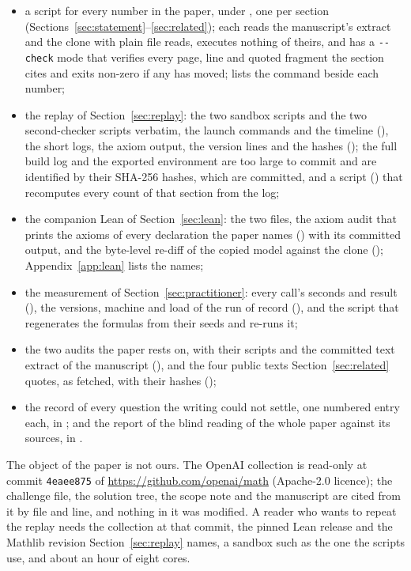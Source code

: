 \begin{itemize}
\item a script for every number in the paper, under
  , one per section
  (Sections~\ref{sec:statement}--\ref{sec:related}); each reads the
  manuscript's extract and the clone with plain file reads, executes
  nothing of theirs, and has a \texttt{-{}-check} mode that verifies every
  page, line and quoted fragment the section cites and exits non-zero
  if any has moved;  lists the command beside
  each number;
\item the replay of Section~\ref{sec:replay}: the two sandbox scripts
  and the two second-checker scripts verbatim, the launch commands and
  the timeline (), the short logs,
  the axiom output, the version lines and the hashes
  (); the full build log and the exported
  environment are too large to commit and are identified by their
  SHA-256 hashes, which are committed, and a script
  () that recomputes every count of
  that section from the log;
\item the companion Lean of Section~\ref{sec:lean}: the two files, the
  axiom audit that prints the axioms of every declaration the paper
  names () with its committed
  output, and the byte-level re-diff of the copied model against the
  clone (); Appendix~\ref{app:lean}
  lists the names;
\item the measurement of Section~\ref{sec:practitioner}: every call's
  seconds and result (),
  the versions, machine and load of the run of record
  (), and the
  script that regenerates the formulas from their seeds and re-runs it;
\item the two audits the paper rests on, with their scripts and the
  committed text extract of the manuscript
  (), and the four public texts
  Section~\ref{sec:related} quotes, as fetched, with their hashes
  ();
\item the record of every question the writing could not settle, one
  numbered entry each, in ; and the
  report of the blind reading of the whole paper against its sources,
  in .
\end{itemize}
The object of the paper is not ours. The OpenAI collection is read-only
at commit \texttt{4eaee875} of \url{https://github.com/openai/math}
(Apache-2.0 licence); the challenge file, the solution tree, the scope
note and the manuscript are cited from it by file and line, and nothing
in it was modified. A reader who wants to repeat the replay needs the
collection at that commit, the pinned Lean release and the Mathlib
revision Section~\ref{sec:replay} names, a sandbox such as the one the
scripts use, and about an hour of eight cores.


